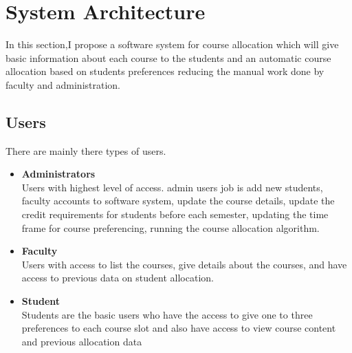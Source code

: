 \documentclass[conference]{IEEEtran}
\begin{document}
\section{ \textbf{System Architecture} }

In this section,I propose a software system for course allocation which will give basic information about each course 
to the students and an automatic course allocation based on students preferences reducing the manual work done by faculty and administration. 

\subsection{Users}

There are mainly there types of users.\\
\begin{itemize} 
\item \textbf{Administrators}\\
Users with highest level of access.
admin users job is add new students, faculty accounts to software system, 
update the course details,
update the credit requirements for students before each semester,
updating the time frame for course preferencing,
running the course allocation algorithm.

\item \textbf{Faculty}\\
Users with access to list the courses, give details about the courses, 
and have access to  previous data on student allocation.

\item \textbf{Student}\\
Students are the basic users who have the access to give one to three preferences to each course slot 
and also have access to view course content and previous allocation data
\end{itemize}
\end{document}
